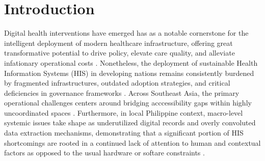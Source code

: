 \documentclass[manuscript, screen, review]{acmart}
\begin{document}


\maketitle

\section{Introduction}
\label{sec:introduction}
Digital health interventions have emerged has as a notable cornerstone for the intelligent deployment of modern healthcare infrastructure, offering great transformative potential to drive policy, elevate care quality, and alleviate infationary operational costs \cite{foodanddrugadministration_2020_what, fatehi_2020_what}. Nonetheless, the deployment of sustainable Health Information Systems (HIS) in developing nations remains consistently burdened by fragmented infrastructures, outdated adoption strategies, and critical deficiencies in governance frameworks \cite{epizitone_2023_a,rahman_2024_healthcare,sucaldito_2025_challenges}. Across Southeast Asia, the primary operational challenges centers around bridging acccessibility gaps within highly uncoordinated spaces \cite{lu_2021_assessment}. Furthermore, in local Philippine context, macro-level systemic issues take shape as underutilized digital records and overly convoluted data extraction mechanisms, demonstrating that a significant portion of HIS shortcomings are rooted in a continued lack of attention to human and contextual factors as opposed to the usual hardware or softare constraints \cite{garcia_2021_health,leary_2022_an}. 
\end{document}
